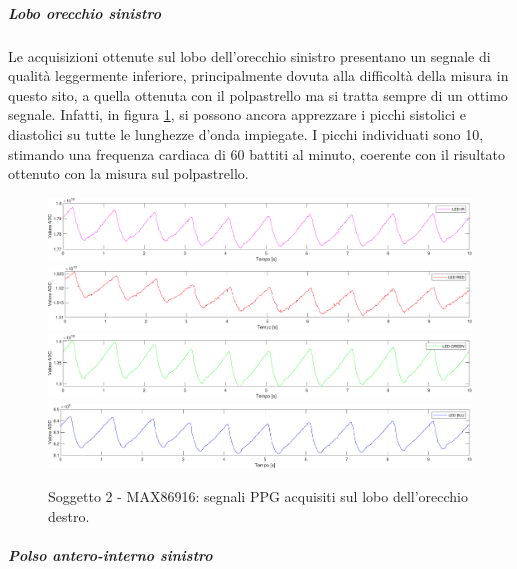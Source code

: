 \clearpage

\subparagraph{Lobo orecchio sinistro}

Le acquisizioni ottenute sul lobo dell'orecchio sinistro presentano un segnale di qualità leggermente inferiore, principalmente dovuta alla difficoltà della misura in questo sito, a quella ottenuta con il polpastrello ma si tratta sempre di un ottimo segnale. Infatti, in figura \ref{fig:soggetto2_MAX86916_lobo}, si possono ancora apprezzare i picchi sistolici e diastolici su tutte le lunghezze d'onda impiegate. I picchi individuati sono 10, stimando una frequenza cardiaca di 60 battiti al minuto, coerente con il risultato ottenuto con la misura sul polpastrello.
\begin{figure}[h]
	\centering
	\includegraphics[width=1\linewidth]{ImageFiles/Misure Preliminari/Soggetto 2/max86916/lobo_ired}
	\includegraphics[width=1\linewidth]{ImageFiles/Misure Preliminari/Soggetto 2/max86916/lobo_red}
	\includegraphics[width=1\linewidth]{ImageFiles/Misure Preliminari/Soggetto 2/max86916/lobo_green}
	\includegraphics[width=1\linewidth]{ImageFiles/Misure Preliminari/Soggetto 2/max86916/lobo_blu}
	\caption{Soggetto 2 - MAX86916: segnali PPG acquisiti sul lobo dell'orecchio destro.}
	\label{fig:soggetto2_MAX86916_lobo}
\end{figure}

\subparagraph{Polso antero-interno sinistro}

